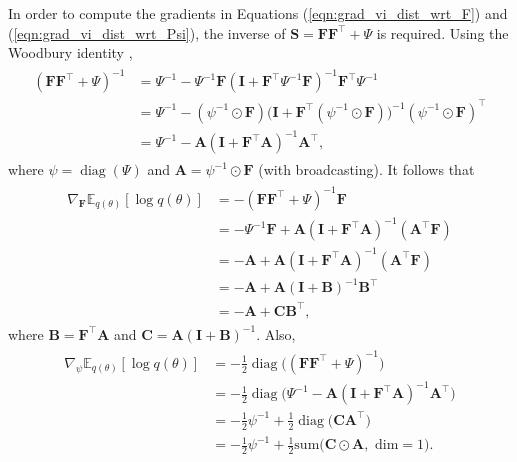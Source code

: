 \documentclass[msc,deptreport.inf]{infthesis} %
\newcommand{\matr}[1]{\mathbf{#1}}
\newcommand{\E}{\mathbb E}
\newcommand{\diag}{\mathop{\mathrm{diag}}}
\begin{document}
In order to compute the gradients in Equations (\ref{eqn:grad_vi_dist_wrt_F}) and (\ref{eqn:grad_vi_dist_wrt_Psi}), the inverse of $\matr{S} = \matr{FF}^{\intercal} + \Psi$ is required. Using the Woodbury identity \cite{petersen2012},
\begin{align}
\begin{split}
	( \matr{FF}^{\intercal} + \Psi)^{-1}
	& = \Psi^{-1} - \Psi^{-1}\matr{F}(\matr{I} + \matr{F}^\intercal \Psi^{-1} \matr{F})^{-1} \matr{F}^\intercal \Psi^{-1} \\
	& = \Psi^{-1} - (\psi^{-1} \odot \matr{F}) \big(\matr{I} + \matr{F}^\intercal (\psi^{-1} \odot \matr{F})\big)^{-1} (\psi^{-1} \odot \matr{F})^\intercal \\
	& = \Psi^{-1} - \matr{A} (\matr{I} + \matr{F}^\intercal \matr{A})^{-1} \matr{A}^\intercal,
\end{split}
\end{align}
where $\psi = \diag(\Psi)$ and $\matr{A} = \psi^{-1} \odot \matr{F}$ (with broadcasting). It follows that
\begin{align}
\begin{split}
	\nabla_\matr{F} \E_{q(\theta)} [\log q(\theta)]
	& = -( \matr{FF}^{\intercal} + \Psi)^{-1}\matr{F} \\
	& = -\Psi^{-1} \matr{F}  + \matr{A}  (\matr{I} + \matr{F}^\intercal \matr{A})^{-1} (\matr{A}^\intercal \matr{F}) \\
	& = -\matr{A}  + \matr{A} (\matr{I} + \matr{F}^\intercal \matr{A})^{-1} (\matr{A}^\intercal \matr{F}) \\
	& = -\matr{A}  + \matr{A} (\matr{I} + \matr{B})^{-1} \matr{B}^\intercal \\
	& = -\matr{A}  + \matr{C} \matr{B}^\intercal,
\end{split}
\end{align}
where $\matr{B} = \matr{F}^\intercal \matr{A}$ and $\matr{C} = \matr{A} (\matr{I} + \matr{B})^{-1}$. Also,
\begin{align}
\begin{split}
	\nabla_\psi \E_{q(\theta)} [\log q(\theta)]
	& = -\frac{1}{2} \diag\big( ( \matr{FF}^{\intercal} + \Psi)^{-1}\big) \\
	& = -\frac{1}{2}\diag\big(\Psi^{-1}  - \matr{A}  (\matr{I} + \matr{F}^\intercal \matr{A})^{-1} \matr{A}^\intercal \big) \\
	& = -\frac{1}{2}\psi^{-1} + \frac{1}{2} \diag\big(\matr{C} \matr{A}^\intercal \big) \\
	& = -\frac{1}{2}\psi^{-1} + \frac{1}{2} \text{sum}\big(\matr{C} \odot \matr{A}, \text{ dim} = 1\big).
\end{split}
\end{align}
\end{document}
